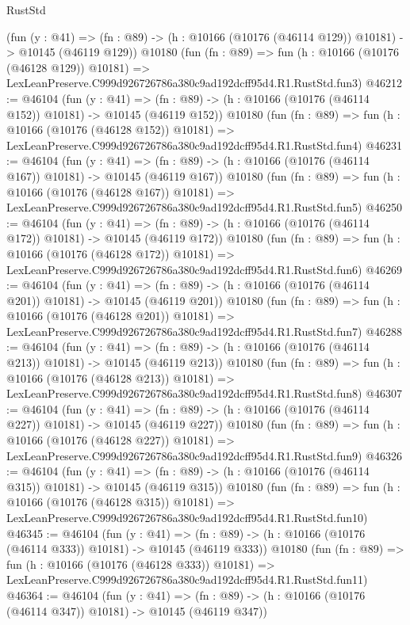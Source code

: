 \begin{lexlean}{RustStd}
\begin{coremodule}
    (fun (y : @41) =>
    (fn : @89) -> (h : @10166 (@10176 (@46114 @129)) @10181) -> @10145 (@46119 @129))
    @10180
    (fun (fn : @89) =>
    fun (h : @10166 (@10176 (@46128 @129)) @10181) =>
    LexLeanPreserve.C999d926726786a380c9ad192dcff95d4.R1.RustStd.fun3)
@46212 := @46104
    (fun (y : @41) =>
    (fn : @89) -> (h : @10166 (@10176 (@46114 @152)) @10181) -> @10145 (@46119 @152))
    @10180
    (fun (fn : @89) =>
    fun (h : @10166 (@10176 (@46128 @152)) @10181) =>
    LexLeanPreserve.C999d926726786a380c9ad192dcff95d4.R1.RustStd.fun4)
@46231 := @46104
    (fun (y : @41) =>
    (fn : @89) -> (h : @10166 (@10176 (@46114 @167)) @10181) -> @10145 (@46119 @167))
    @10180
    (fun (fn : @89) =>
    fun (h : @10166 (@10176 (@46128 @167)) @10181) =>
    LexLeanPreserve.C999d926726786a380c9ad192dcff95d4.R1.RustStd.fun5)
@46250 := @46104
    (fun (y : @41) =>
    (fn : @89) -> (h : @10166 (@10176 (@46114 @172)) @10181) -> @10145 (@46119 @172))
    @10180
    (fun (fn : @89) =>
    fun (h : @10166 (@10176 (@46128 @172)) @10181) =>
    LexLeanPreserve.C999d926726786a380c9ad192dcff95d4.R1.RustStd.fun6)
@46269 := @46104
    (fun (y : @41) =>
    (fn : @89) -> (h : @10166 (@10176 (@46114 @201)) @10181) -> @10145 (@46119 @201))
    @10180
    (fun (fn : @89) =>
    fun (h : @10166 (@10176 (@46128 @201)) @10181) =>
    LexLeanPreserve.C999d926726786a380c9ad192dcff95d4.R1.RustStd.fun7)
@46288 := @46104
    (fun (y : @41) =>
    (fn : @89) -> (h : @10166 (@10176 (@46114 @213)) @10181) -> @10145 (@46119 @213))
    @10180
    (fun (fn : @89) =>
    fun (h : @10166 (@10176 (@46128 @213)) @10181) =>
    LexLeanPreserve.C999d926726786a380c9ad192dcff95d4.R1.RustStd.fun8)
@46307 := @46104
    (fun (y : @41) =>
    (fn : @89) -> (h : @10166 (@10176 (@46114 @227)) @10181) -> @10145 (@46119 @227))
    @10180
    (fun (fn : @89) =>
    fun (h : @10166 (@10176 (@46128 @227)) @10181) =>
    LexLeanPreserve.C999d926726786a380c9ad192dcff95d4.R1.RustStd.fun9)
@46326 := @46104
    (fun (y : @41) =>
    (fn : @89) -> (h : @10166 (@10176 (@46114 @315)) @10181) -> @10145 (@46119 @315))
    @10180
    (fun (fn : @89) =>
    fun (h : @10166 (@10176 (@46128 @315)) @10181) =>
    LexLeanPreserve.C999d926726786a380c9ad192dcff95d4.R1.RustStd.fun10)
@46345 := @46104
    (fun (y : @41) =>
    (fn : @89) -> (h : @10166 (@10176 (@46114 @333)) @10181) -> @10145 (@46119 @333))
    @10180
    (fun (fn : @89) =>
    fun (h : @10166 (@10176 (@46128 @333)) @10181) =>
    LexLeanPreserve.C999d926726786a380c9ad192dcff95d4.R1.RustStd.fun11)
@46364 := @46104
    (fun (y : @41) =>
    (fn : @89) -> (h : @10166 (@10176 (@46114 @347)) @10181) -> @10145 (@46119 @347))

\end{coremodule}
\end{lexlean}

